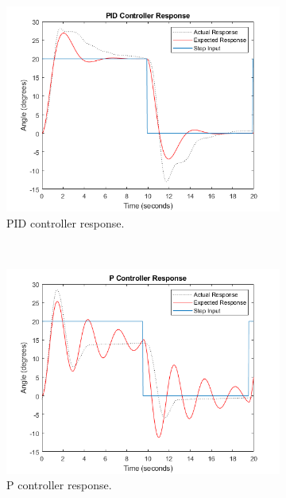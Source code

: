 \documentclass[12pt]{article} %
\begin{document}
\begin{figure}[H]
	\centering
	\begin{subfigure}[b]{0.9\textwidth}
		\includegraphics[width=\textwidth]{pid-control}
		\caption{PID controller response.}
		\label{fig:pid-control}
	\end{subfigure}
	\\[1em]
	\begin{subfigure}[b]{0.45\textwidth}
		\includegraphics[width=\textwidth]{p-control}
		\caption{P controller response.}
		\label{fig:p-control}
	\end{subfigure}
	\begin{subfigure}[b]{0.45\textwidth}

\end{subfigure}
\end{figure}
\end{document}
